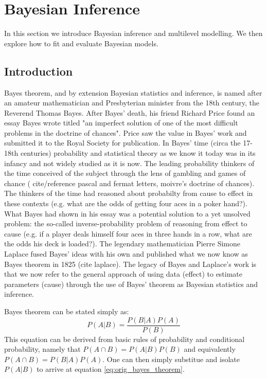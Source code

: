 \section{Bayesian Inference}

In this section we introduce Bayesian inference and multilevel modelling. We then explore how to fit and evaluate Bayesian models.

\subsection{Introduction}

Bayes theorem, and by extension Bayesian statistics and inference, is named after an amateur mathematician and Presbyterian minister from the 18th century, the Reverend Thomas Bayes. After Bayes' death, his friend Richard Price found an essay Bayes wrote titled "an imperfect solution of one of the most difficult problems in the doctrine of chances". Price saw the value in Bayes' work and submitted it to the Royal Society for publication. In Bayes' time (circa the 17-18th centuries) probability and statistical theory as we know it today was in its infancy and not widely studied as it is now. The leading probability thinkers of the time conceived of the subject through the lens of gambling and games of chance ( cite/reference pascal and fermat letters, moivre's doctrine of chances). The thinkers of the time had reasoned about probabilty from cause to effect in these contexts (e.g. what are the odds of getting four aces in a poker hand?). What Bayes had shown in his essay was a potential solution to a yet unsolved problem: the so-called inverse-probability problem of reasoning from effect to cause (e.g. if a player deals himself four aces in three hands in a row, what are the odds his deck is loaded?). The legendary mathematician Pierre Simone Laplace fused Bayes' ideas with his own and published what we now know as Bayes theorem in 1825 (cite laplace). The legacy of Bayes and Laplace's work is that we now refer to the general approach of using data (effect) to estimate parameters (cause) through the use of Bayes' theorem as Bayesian statistics and inference.

Bayes theorem can be stated simply as:
\begin{equation} \label{eq:orig_bayes_theorem}
P(A|B) = \frac{P(B|A)P(A)}{P(B)}
\end{equation}
This equation can be derived from basic rules of probability and conditional probability, namely that $P(A \cap B) = P(A|B)P(B)$ and equivalently $P(A \cap B) = P(B|A)P(A)$. One can then simply substitue and isolate $P(A|B)$ to arrive at equation \ref{eq:orig_bayes_theorem}.

